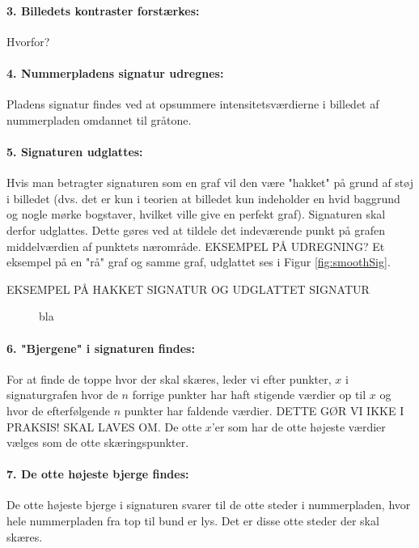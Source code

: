 \paragraph{3. Billedets kontraster forstærkes:}
Hvorfor?

\paragraph{4. Nummerpladens signatur udregnes:}
Pladens signatur findes ved at opsummere intensitetsværdierne i billedet af nummerpladen omdannet til gråtone.

\paragraph{5. Signaturen udglattes:}
Hvis man betragter signaturen som en graf vil den være "hakket" på grund af støj i billedet (dvs. det er kun i teorien at billedet kun indeholder en hvid baggrund og nogle mørke bogstaver, hvilket ville give en perfekt graf). Signaturen skal derfor udglattes. Dette gøres ved at tildele det indeværende punkt på grafen middelværdien af punktets nærområde. EKSEMPEL PÅ UDREGNING? Et eksempel på en "rå" graf og samme graf, udglattet ses i Figur \vref{fig:smoothSig}.

EKSEMPEL PÅ HAKKET SIGNATUR OG UDGLATTET SIGNATUR

\begin{figure}[htp]
\label{fig:smoothSig}
\caption{bla}
\end{figure}

\paragraph{6. "Bjergene" i signaturen findes:}
For at finde de toppe hvor der skal skæres, leder vi efter punkter, $x$ i signaturgrafen hvor de $n$ forrige punkter har haft stigende værdier op til $x$ og hvor de efterfølgende $n$ punkter har faldende værdier. DETTE GØR VI IKKE I PRAKSIS! SKAL LAVES OM. De otte $x$'er som har de otte højeste værdier vælges som de otte skæringspunkter.

\paragraph{7. De otte højeste bjerge findes:}
De otte højeste bjerge i signaturen svarer til de otte steder i nummerpladen, hvor hele nummerpladen fra top til bund er lys. Det er disse otte steder der skal skæres.

